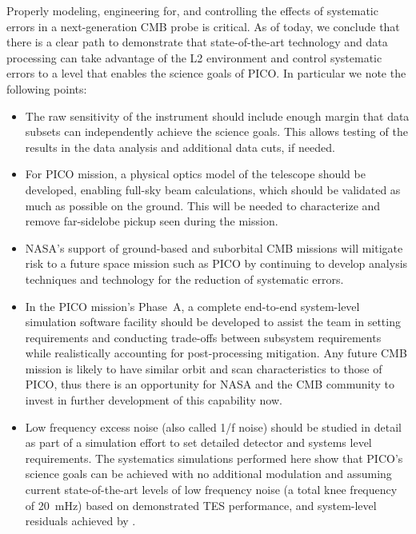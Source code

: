 \documentclass[PICOReport.tex]{subfiles}
\begin{document}
Properly modeling, engineering for, and controlling the effects of systematic errors in a
next-generation CMB probe is critical.  As of today, we conclude that there is a clear path to demonstrate that state-of-the-art technology and data processing can take advantage of the L2 environment and control systematic errors to a level that enables the science goals of PICO. In particular we note the following points:
\begin{itemize}
\item The raw sensitivity of the instrument should include enough margin
that data subsets can independently achieve the science goals.
This allows testing of the results in the data analysis and additional
data cuts, if needed.
\item For PICO mission, a physical optics model of the telescope should be developed, enabling full-sky beam calculations, which should be validated as much as possible on the ground.  This will be needed to characterize and remove far-sidelobe pickup seen during the mission. 
\item NASA's support of ground-based and suborbital CMB missions will mitigate risk to a future space mission such as PICO by continuing to develop analysis techniques and technology for the reduction of systematic errors.

\item In the PICO mission's Phase~A, a complete end-to-end system-level
simulation software facility should be developed to assist the team in setting 
requirements and conducting trade-offs between subsystem requirements while
realistically accounting for post-processing mitigation.  Any future
CMB mission is likely to have similar orbit  
and scan characteristics to those of PICO, thus there is an opportunity for NASA and
the CMB community to invest in further development of this capability now.
\item Low frequency excess noise (also called 1/f noise) should be studied in detail as part of a simulation effort to set detailed detector and systems level requirements.  The systematics simulations performed here show that PICO's science goals can be achieved with no additional modulation and assuming current state-of-the-art levels of low frequency noise (a total knee frequency of 20~mHz) based on demonstrated TES performance, and system-level residuals achieved by \planck.
\end{itemize}
\end{document}
